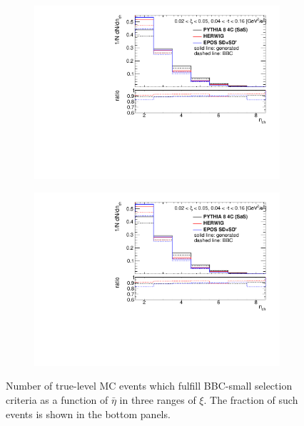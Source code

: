 \begin{figure}[H]
\begin{subfigure}{.49\textwidth}
	\end{subfigure}
	\vspace{-0.1cm}
	\begin{subfigure}{.49\textwidth}
		\includegraphics[width=\textwidth,page=13]{chapters/chrgSTAR/img/bbcCorrection/xi_bbc.pdf}
	\end{subfigure}
	\begin{subfigure}{.49\textwidth}
		\includegraphics[width=\textwidth,page=13]{chapters/chrgSTAR/img/bbcCorrection/xi_bbc.pdf}
	\end{subfigure}
	\vspace{-0.2cm}
	\begin{minipage}{.49\textwidth}
		\caption{Number of true-level MC events which fulfill BBC-small selection criteria  as a function of $\bar{\eta}$ in three ranges of $\xi$. The fraction of such events is shown in the bottom panels.}
		\label{fig:bbcCorection_eta}
	\end{minipage}
	
\end{figure}


